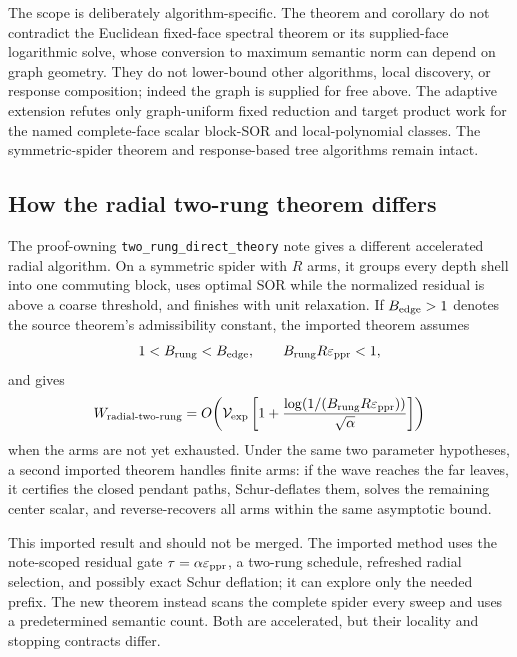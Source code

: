 The scope is deliberately algorithm-specific.  The theorem and corollary do
not contradict the Euclidean fixed-face spectral theorem or its supplied-face
logarithmic solve, whose conversion to maximum semantic norm can depend on
graph geometry.  They do not lower-bound other algorithms, local discovery,
or response composition; indeed the graph is supplied for free above.  The
adaptive extension refutes only graph-uniform fixed reduction and target
product work for the named complete-face scalar block-SOR and local-polynomial
classes.  The
symmetric-spider theorem and response-based tree algorithms remain intact.

\subsection{How the radial two-rung theorem differs}

The proof-owning \texttt{two\_rung\_direct\_theory} note gives a different
accelerated radial algorithm.  On a symmetric spider with $R$ arms, it groups
every depth shell into one commuting block, uses optimal SOR while the
normalized residual is above a coarse threshold, and finishes with unit
relaxation.  If
$B_{\rm edge}>1$ denotes the source theorem's admissibility constant, the
imported theorem assumes
\begin{equation*}
 1<B_{\rm rung}<B_{\rm edge},
 \qquad
 B_{\rm rung}R\varepsilon_{\rm ppr}<1,
\end{equation*}
and gives
\begin{equation}
 W_{\rm radial\text{-}two\text{-}rung}
 =O\!\left(
  \mathcal V_{\rm exp}
  \left[1+
   \frac{\log(1/(B_{\rm rung}R\varepsilon_{\rm ppr}))}
        {\sqrt\alpha}
  \right]
 \right)
 \label{eq:imported-radial-two-rung}
\end{equation}
when the arms are not yet exhausted.  Under the same two parameter
hypotheses, a second imported theorem handles finite arms: if the wave reaches
the far leaves, it certifies the closed pendant paths, Schur-deflates them,
solves the remaining center scalar, and reverse-recovers all arms within the
same asymptotic bound.

This imported result and
 should not be merged.  The imported method
uses the note-scoped residual gate
$\tau=\alpha\varepsilon_{\rm ppr}$, a two-rung schedule, refreshed radial
selection, and possibly exact Schur deflation; it can explore only the needed
prefix.  The new theorem instead scans the complete spider every sweep and
uses a predetermined semantic count.  Both are accelerated, but their
locality and stopping contracts differ.

